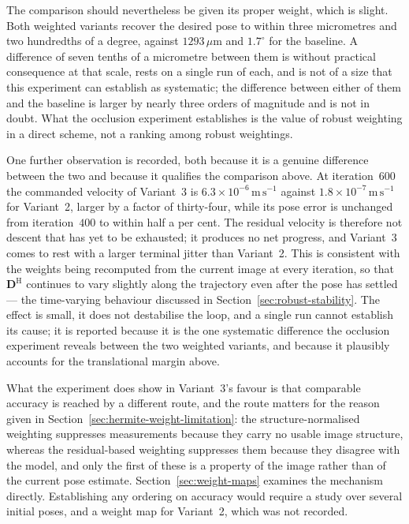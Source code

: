 The comparison should nevertheless be given its proper weight, which is
slight. Both weighted variants recover the desired pose to within three
micrometres and two hundredths of a degree, against $1293\,\mu\mathrm{m}$ and
$1.7^{\circ}$ for the baseline. A difference of seven tenths of a micrometre
between them is without practical consequence at that scale, rests on a single
run of each, and is not of a size that this experiment can establish as
systematic; the difference between either of them and the baseline is larger
by nearly three orders of magnitude and is not in doubt. What the occlusion
experiment establishes is the value of robust weighting in a direct scheme,
not a ranking among robust weightings.

One further observation is recorded, both because it is a genuine difference
between the two and because it qualifies the comparison above. At
iteration~$600$ the commanded velocity of Variant~3 is
$6.3\times10^{-6}\,\mathrm{m\,s^{-1}}$ against
$1.8\times10^{-7}\,\mathrm{m\,s^{-1}}$ for Variant~2, larger by a factor of
thirty-four, while its pose error is unchanged from iteration~$400$ to within
half a per cent. The residual velocity is therefore not descent that has yet
to be exhausted; it produces no net progress, and Variant~3 comes to rest with
a larger terminal jitter than Variant~2. This is consistent with the weights
being recomputed from the current image at every iteration, so that
$\mathbf{D}^{\mathrm{H}}$ continues to vary slightly along the trajectory even
after the pose has settled --- the time-varying behaviour discussed in
Section~\ref{sec:robust-stability}. The effect is small, it does not
destabilise the loop, and a single run cannot establish its cause; it is
reported because it is the one systematic difference the occlusion experiment
reveals between the two weighted variants, and because it plausibly accounts
for the translational margin above.

What the experiment does show in Variant~3's favour is that comparable
accuracy is reached by a different route, and the route matters for the reason
given in Section~\ref{sec:hermite-weight-limitation}: the structure-normalised
weighting suppresses measurements because they carry no usable image
structure, whereas the residual-based weighting suppresses them because they
disagree with the model, and only the first of these is a property of the
image rather than of the current pose estimate.
Section~\ref{sec:weight-maps} examines the mechanism directly. Establishing
any ordering on accuracy would require a study over several initial poses,
and a weight map for Variant~2, which
was not recorded.

